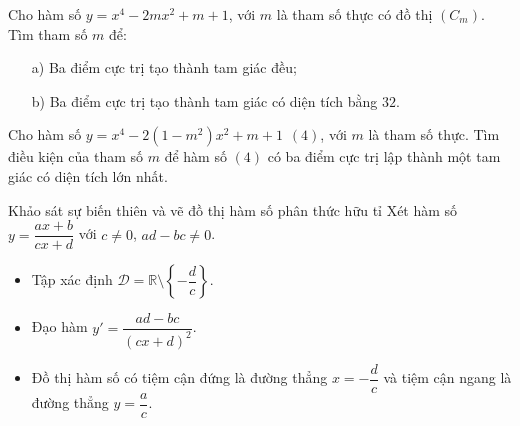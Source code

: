 \begin{bt}%
	Cho hàm số $y=x^4-2mx^2+m+1$, với $m$ là tham số thực có đồ thị $\left(C_m\right)$. Tìm tham số $m$ để:
	\begin{enumerate}
		\item[a)] Ba điểm cực trị tạo thành tam giác đều;
		\item[b)] Ba điểm cực trị tạo thành tam giác có diện tích bằng $32$.
	\end{enumerate}
\end{bt}

\begin{bt}%
	Cho hàm số $y=x^4-2\left(1-m^2\right)x^2+m+1\hspace{5pt}(4)$, với $m$ là tham số thực. Tìm điều kiện của tham số $m$ để hàm số $(4)$ có ba điểm cực trị lập thành một tam giác có diện tích lớn nhất.
\end{bt}

\begin{dang}{Khảo sát sự biến thiên và vẽ đồ thị hàm số phân thức hữu tỉ}
	Xét hàm số $y=\dfrac{ax+b}{cx+d}$ với $c\ne 0$, $ad-bc\ne 0$.
	\begin{itemize}
		\item Tập xác định $\mathscr{D}=\mathbb{R}\setminus \left\{-\dfrac{d}{c}\right\}$.
		\item Đạo hàm $y'=\dfrac{ad-bc}{\left(cx+d\right)^2}$.
		\item Đồ thị hàm số có tiệm cận đứng là đường thẳng $x=-\dfrac{d}{c}$ và tiệm cận ngang là đường thẳng $y=\dfrac{a}{c}$.
	\end{itemize}
\end{dang}

